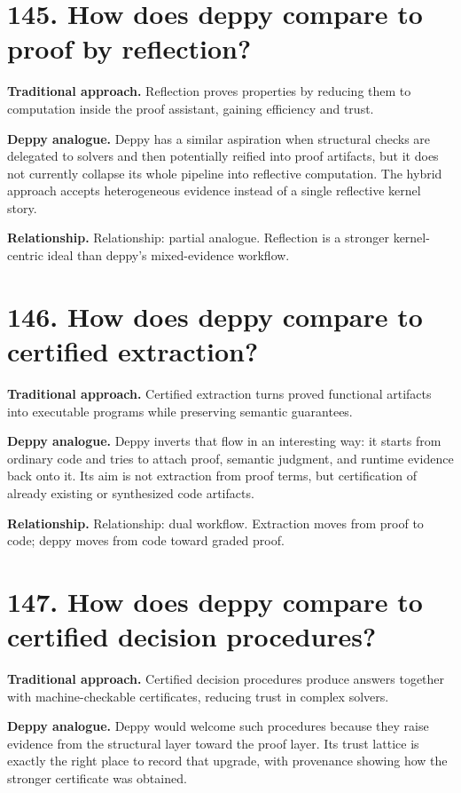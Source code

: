\documentclass[11pt,openany]{book}
\begin{document}
\section*{145. How does deppy compare to proof by reflection?}
\textbf{Traditional approach.} Reflection proves properties by reducing them to computation inside the proof assistant, gaining efficiency and trust.

\textbf{Deppy analogue.} Deppy has a similar aspiration when structural checks are delegated to solvers and then potentially reified into proof artifacts, but it does not currently collapse its whole pipeline into reflective computation. The hybrid approach accepts heterogeneous evidence instead of a single reflective kernel story.

\textbf{Relationship.} Relationship: partial analogue. Reflection is a stronger kernel-centric ideal than deppy's mixed-evidence workflow.

\section*{146. How does deppy compare to certified extraction?}
\textbf{Traditional approach.} Certified extraction turns proved functional artifacts into executable programs while preserving semantic guarantees.

\textbf{Deppy analogue.} Deppy inverts that flow in an interesting way: it starts from ordinary code and tries to attach proof, semantic judgment, and runtime evidence back onto it. Its aim is not extraction from proof terms, but certification of already existing or synthesized code artifacts.

\textbf{Relationship.} Relationship: dual workflow. Extraction moves from proof to code; deppy moves from code toward graded proof.

\section*{147. How does deppy compare to certified decision procedures?}
\textbf{Traditional approach.} Certified decision procedures produce answers together with machine-checkable certificates, reducing trust in complex solvers.

\textbf{Deppy analogue.} Deppy would welcome such procedures because they raise evidence from the structural layer toward the proof layer. Its trust lattice is exactly the right place to record that upgrade, with provenance showing how the stronger certificate was obtained.
\end{document}
